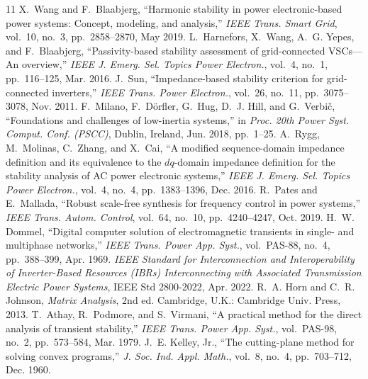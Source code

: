 \documentclass[10pt,twocolumn]{article}
\begin{document}
\begin{thebibliography}{11}
\footnotesize
{} X.~Wang and F.~Blaabjerg, ``Harmonic stability in power electronic-based power systems: Concept, modeling, and analysis,'' \textit{IEEE Trans. Smart Grid}, vol.~10, no.~3, pp.~2858--2870, May 2019.
 L.~Harnefors, X.~Wang, A.~G. Yepes, and F.~Blaabjerg, ``Passivity-based stability assessment of grid-connected VSCs---An overview,'' \textit{IEEE J. Emerg. Sel. Topics Power Electron.}, vol.~4, no.~1, pp.~116--125, Mar. 2016.
 J.~Sun, ``Impedance-based stability criterion for grid-connected inverters,'' \textit{IEEE Trans. Power Electron.}, vol.~26, no.~11, pp.~3075--3078, Nov. 2011.
 F.~Milano, F.~D\"orfler, G.~Hug, D.~J. Hill, and G.~Verbi\v{c}, ``Foundations and challenges of low-inertia systems,'' in \textit{Proc. 20th Power Syst. Comput. Conf. (PSCC)}, Dublin, Ireland, Jun. 2018, pp.~1--25.
 A.~Rygg, M.~Molinas, C.~Zhang, and X.~Cai, ``A modified sequence-domain impedance definition and its equivalence to the $dq$-domain impedance definition for the stability analysis of AC power electronic systems,'' \textit{IEEE J. Emerg. Sel. Topics Power Electron.}, vol.~4, no.~4, pp.~1383--1396, Dec. 2016.
 R.~Pates and E.~Mallada, ``Robust scale-free synthesis for frequency control in power systems,'' \textit{IEEE Trans. Autom. Control}, vol.~64, no.~10, pp.~4240--4247, Oct. 2019.
 H.~W. Dommel, ``Digital computer solution of electromagnetic transients in single- and multiphase networks,'' \textit{IEEE Trans. Power App. Syst.}, vol.~PAS-88, no.~4, pp.~388--399, Apr. 1969.
 \textit{IEEE Standard for Interconnection and Interoperability of Inverter-Based Resources (IBRs) Interconnecting with Associated Transmission Electric Power Systems}, IEEE Std 2800-2022, Apr. 2022.
 R.~A. Horn and C.~R. Johnson, \textit{Matrix Analysis}, 2nd ed. Cambridge, U.K.: Cambridge Univ. Press, 2013.
 T.~Athay, R.~Podmore, and S.~Virmani, ``A practical method for the direct analysis of transient stability,'' \textit{IEEE Trans. Power App. Syst.}, vol.~PAS-98, no.~2, pp.~573--584, Mar. 1979.
 J.~E. Kelley, Jr., ``The cutting-plane method for solving convex programs,'' \textit{J. Soc. Ind. Appl. Math.}, vol.~8, no.~4, pp.~703--712, Dec. 1960.
\end{thebibliography}
\end{document}
